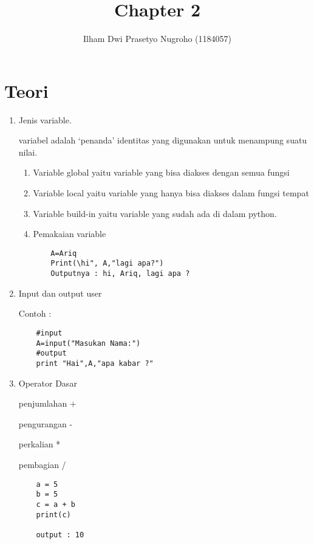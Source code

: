\documentclass{article}
\title{Chapter 2}
\author{Ilham Dwi Prasetyo Nugroho (1184057)}
\begin{document}
\maketitle

\section{Teori}
\begin{enumerate}
\item Jenis variable.
\par variabel adalah ‘penanda’ identitas yang digunakan untuk menampung suatu nilai.
\begin{enumerate}	
	\item Variable global yaitu variable yang bisa diakses dengan semua fungsi
	\item Variable local yaitu variable yang hanya bisa diakses dalam fungsi tempat 
	\item Variable build-in yaitu variable yang sudah ada di dalam python.
    \item Pemakaian variable
\begin{verbatim}
	A=Ariq 
	Print(\hi", A,"lagi apa?") 
	Outputnya : hi, Ariq, lagi apa ?
\end{verbatim}

\end{enumerate}

\item  Input dan output user
\par Contoh :
\begin{verbatim}
	#input
	A=input("Masukan Nama:")
	#output
	print "Hai",A,"apa kabar ?" 	
\end{verbatim}
\item Operator Dasar
\par penjumlahan +
\par pengurangan -
\par perkalian *
\par pembagian /
\begin{verbatim}
	a = 5
	b = 5
	c = a + b
	print(c)
	
	output : 10
	

\end{verbatim}
\end{enumerate}
\end{document}

